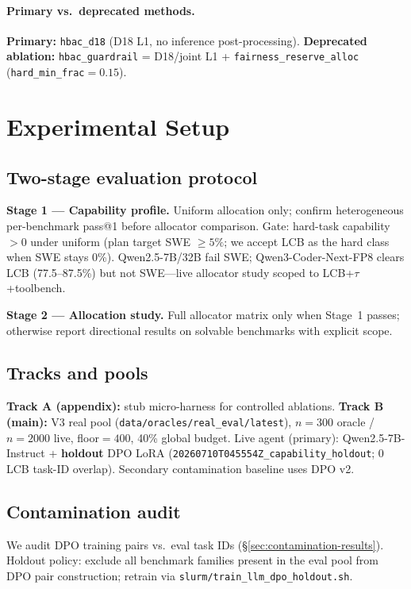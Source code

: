 \documentclass[11pt,letterpaper]{article}
\makeatletter
\newcommand{\passat}[1]{pass@#1}
\makeatother
\begin{document}
\paragraph{Primary vs.\ deprecated methods.}
\textbf{Primary:} \texttt{hbac\_d18} (D18 L1, no inference post-processing).
\textbf{Deprecated ablation:} \texttt{hbac\_guardrail} = D18/joint L1 + \texttt{fairness\_reserve\_alloc} (\texttt{hard\_min\_frac}${=}0.15$).

\section{Experimental Setup}
\label{sec:setup}

\subsection{Two-stage evaluation protocol}

\textbf{Stage 1 --- Capability profile.} Uniform allocation only; confirm heterogeneous per-benchmark \passat{1} before allocator comparison.
Gate: hard-task capability $>$0 under uniform (plan target SWE $\ge 5\%$; we accept LCB as the hard class when SWE stays 0\%).
Qwen2.5-7B/32B fail SWE; Qwen3-Coder-Next-FP8 clears LCB (77.5--87.5\%) but not SWE---live allocator study scoped to LCB+$\tau$+toolbench.

\textbf{Stage 2 --- Allocation study.} Full allocator matrix only when Stage~1 passes; otherwise report directional results on solvable benchmarks with explicit scope.

\subsection{Tracks and pools}

\textbf{Track A (appendix):} stub micro-harness for controlled ablations.
\textbf{Track B (main):} V3 real pool (\texttt{data/oracles/real\_eval/latest}), $n{=}300$ oracle / $n{=}2000$ live, floor${=}400$, 40\% global budget.
Live agent (primary): Qwen2.5-7B-Instruct + \textbf{holdout} DPO LoRA (\texttt{20260710T045554Z\_capability\_holdout}; 0 LCB task-ID overlap).
Secondary contamination baseline uses DPO v2.

\subsection{Contamination audit}
\label{sec:contamination}

We audit DPO training pairs vs.\ eval task IDs (\S\ref{sec:contamination-results}).
Holdout policy: exclude all benchmark families present in the eval pool from DPO pair construction; retrain via \texttt{slurm/train\_llm\_dpo\_holdout.sh}.
\end{document}
